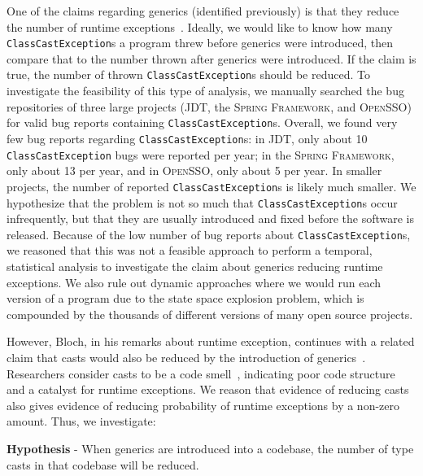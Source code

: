 \documentclass{svjour3}
\newcommand{\code}[1]{\texttt{#1}}
\newcounter{hypothesis}
\newcommand{\hypothesis}[1]{\refstepcounter{hypothesis}\medskip\noindent\textbf{Hypothesis \arabic{hypothesis}} - #1 \medskip}
\newcommand{\spring}{the \textsc{Spring Framework}\xspace}
\newcommand{\jdt}{\textsc{JDT}\xspace}
\newcommand{\opensso}{\textsc{OpenSSO}\xspace}
\begin{document}
One of the claims regarding generics (identified previously)
is that they reduce the number of runtime exceptions~\cite{bloch2008ej}.
Ideally, we would like to know how many \code{ClassCastException}s
a program threw before generics were introduced,
then compare that to the number thrown after generics were introduced.
If the claim is true, the number of thrown
\code{ClassCastException}s should be reduced.
To investigate the feasibility of this type of analysis,
we manually searched the bug repositories of three
large projects (\jdt, \spring, and \opensso) for
valid bug reports containing \code{ClassCastException}s.
Overall, we found very few bug reports 
regarding \code{ClassCastException}s: 
in \jdt, only about 10 \code{ClassCastException} bugs were reported per year;
in \spring, only about 13 per year,
and in \opensso, only about 5 per year.
In smaller projects, the number of reported \code{ClassCastException}s
is likely much smaller.
We hypothesize that the problem is not so much that \code{ClassCastException}s
occur infrequently, but that they are usually introduced and fixed
before the software is released.
Because of the low number of bug reports about \code{ClassCastException}s,
we reasoned that this was not a feasible approach to perform a temporal,
statistical analysis to investigate the
claim about generics reducing runtime exceptions.
We also rule out dynamic approaches where we would run each
version of a program due to the state space explosion problem, 
which is compounded by the thousands of different versions of many open source
projects.

However, Bloch, in his remarks about runtime exception, continues with a related claim that 
casts would also be reduced by the introduction of generics~\cite{bloch2008ej}.  
Researchers consider casts to be a code smell~\cite{Emden2002Detect}, indicating poor code structure and a catalyst for runtime exceptions.
We reason that evidence of reducing casts also gives evidence of reducing probability of runtime exceptions by a non-zero amount.
Thus, we investigate:

\hypothesis{When generics are introduced into a codebase, 
the number of type casts in that codebase will be reduced.}
\label{hypo:cast_reduction}
\end{document}
